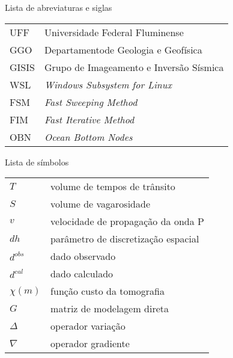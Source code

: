 \listoffigures*
\cleardoublepage

\listoftables*
\cleardoublepage

\begin{center}
\fonteLista Lista de abreviaturas e siglas 
\end{center}

\vspace{2cm}
\fonteNormalSize
\begin{tabular}{l l}
    UFF & Universidade Federal Fluminense \\ [1.0ex]
    GGO & Departamentode Geologia e Geofísica \\ [1.0ex]
    GISIS & Grupo de Imageamento e Inversão Sísmica \\ [1.0ex]
	WSL & \textit{Windows Subsystem for Linux} \\ [1.0ex]
	FSM & \textit{Fast Sweeping Method} \\ [1.0ex]
	FIM & \textit{Fast Iterative Method} \\ [1.0ex]
	OBN & \textit{Ocean Bottom Nodes}
\end{tabular}
\cleardoublepage


\begin{center}
    \fonteLista Lista de símbolos
\end{center}

\vspace{2cm}
\fonteNormalSize
\begin{tabular}{l l}
    $ T $ & volume de tempos de trânsito \\ [1.0ex]
    $ S $ & volume de vagarosidade \\ [1.0ex] 
    $ v $ & velocidade de propagação da onda P \\ [1.0ex]
    $ dh $ & parâmetro de discretização espacial \\ [1.0ex]
    $ d^{obs} $ & dado observado \\ [1.0ex]
    $ d^{cal} $ & dado calculado \\ [1.0ex]
    $ \chi(m) $ & função custo da tomografia \\ [1.0ex]
    $ G $ & matriz de modelagem direta \\ [1.0ex]
    $ \Delta $ & operador variação \\ [1.0ex]
    $ \nabla $ & operador gradiente \\ [1.0ex]
\end{tabular}

    

